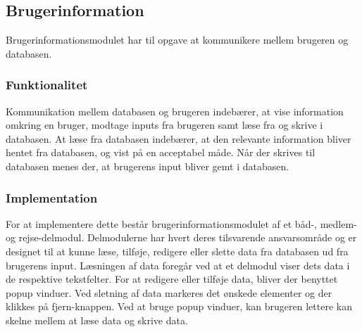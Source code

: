 \subsection{Brugerinformation}
\label{sub:Brugersinformation}

Brugerinformationsmodulet har til opgave at kommunikere mellem brugeren og databasen.

\subsubsection{Funktionalitet}
\label{ssub:brugerinformation_funktionalitet}

Kommunikation mellem databasen og brugeren indebærer, at vise information omkring en bruger, modtage inputs fra brugeren samt læse fra og skrive i databasen. At læse fra databasen indebærer, at den relevante information bliver hentet fra databasen, og vist på en acceptabel måde. Når der skrives til databasen menes der, at brugerens input bliver gemt i databasen. 

\subsubsection{Implementation}
\label{ssub:brugerinformation_implementation}

For at implementere dette består brugerinformationsmodulet af et båd-, medlem- og rejse-delmodul. Delmodulerne har hvert deres tilsvarende ansvarsområde og er designet til at kunne læse, tilføje, redigere eller slette data fra databasen ud fra brugerens input. Læsningen af data foregår ved at et delmodul viser dets data i de respektive tekstfelter. For at redigere eller tilføje data, bliver der benyttet popup vinduer. Ved sletning af data markeres det ønskede elementer og der klikkes på fjern-knappen. Ved at bruge popup vinduer, kan brugeren lettere kan skelne mellem at læse data og skrive data.